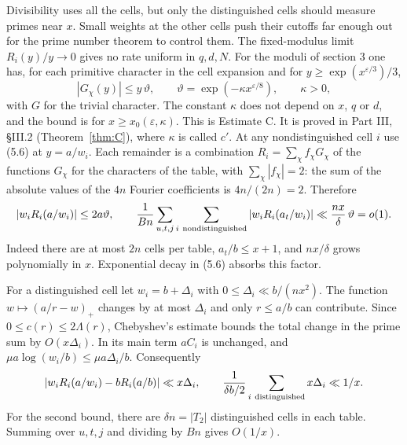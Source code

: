\documentclass[11pt,letterpaper]{article}
\begin{document}
{Divisibility uses all the cells, but only the distinguished cells should measure primes near $x$. Small weights at the other cells push their cutoffs far enough out for the prime number theorem to control them. The fixed-modulus limit $R_i(y)/y\to0$ gives no rate uniform in $q,d,N$. For the moduli of section 3 one has, for each primitive character in the cell expansion and for $y\ge \exp(x^{\varepsilon/3})/3$,
\begin{equation}\label{D:72}
 |G_\chi(y)|\le y\,\vartheta,\qquad
 \vartheta=\exp(-\kappa x^{\varepsilon/8}),\qquad \kappa>0,       \tag{5.6}
\end{equation}
with $G$ for the trivial character. The constant $\kappa$ does not depend on $x$, $q$ or $d$, and the bound is for $x\ge x_0(\varepsilon,\kappa)$. This is Estimate C. It is proved in Part III, \S III.2 (Theorem~\ref{thm:C}), where $\kappa$ is called $c'$. At any nondistinguished cell $i$ use (5.6) at $y=a/w_i$. Each remainder is a combination $R_i=\sum_\chi f_\chi G_\chi$ of the functions $G_\chi$ for the characters of the table, with $\sum_\chi|f_\chi|=2$: the sum of the absolute values of the $4n$ Fourier coefficients is $4n/(2n)=2$. Therefore
\begin{equation}\label{D:73}
 |w_i R_i(a/w_i)|\le2a\vartheta,\qquad
 \frac1{B n}\sum_{u,t,j}\sum_{i\ {\rm nondistinguished}}
        |w_i R_i(a_t/w_i)|\ll \frac{nx}{\delta}\,\vartheta=o(1).
\end{equation}
Indeed there are at most $2n$ cells per table, $a_t/b\le x+1$, and $nx/\delta$ grows polynomially in $x$. Exponential decay in (5.6) absorbs this factor.

For a distinguished cell let $w_i=b+\Delta_i$ with $0\le\Delta_i\ll b/(nx^2)$. The function $w\mapsto(a/r-w)_+$ changes by at most $\Delta_i$ and only $r\le a/b$ can contribute. Since $0\le c(r)\le2\Lambda(r)$, Chebyshev's estimate bounds the total change in the prime sum by $O(x\Delta_i)$. In its main term $aC_i$ is unchanged, and $\mu a\log(w_i/b)\le\mu a\Delta_i/b$. Consequently
\begin{equation}\label{D:74}
 |w_i R_i(a/w_i)-b R_i(a/b)|\ll x\Delta_i,\qquad
 \frac{1}{\delta b/2}\sum_{i\ {\rm distinguished}} x\Delta_i\ll 1/x.
\end{equation}
For the second bound, there are $\delta n=|T_2|$ distinguished cells in each table. Summing over $u,t,j$ and dividing by $Bn$ gives $O(1/x)$.

}
\end{document}
